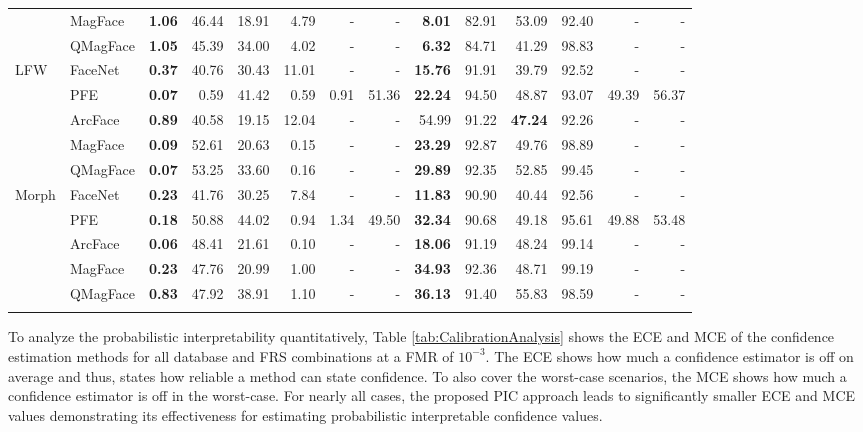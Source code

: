 \documentclass[10pt,twocolumn,letterpaper]{article}
\begin{document}
\begin{table*}[ht]
\begin{tabular}{llrrrrrrrrrrrr}
           & MagFace  & \textbf{1.06}       & 46.44 & 18.91 & 4.79  & -    & -     & \textbf{8.01}       & 82.91 & 53.09 & 92.40 & -      & -     \\
           & QMagFace & \textbf{1.05}       & 45.39 & 34.00 & 4.02  & -    & -     & \textbf{6.32}       & 84.71 & 41.29 & 98.83 & -      & -     \\
\hline
LFW        & FaceNet  & \textbf{0.37}       & 40.76 & 30.43 & 11.01 & -    & -     & \textbf{15.76}      & 91.91 & 39.79 & 92.52 & -      & -     \\
           & PFE      & \textbf{0.07}       & 0.59  & 41.42 & 0.59  & 0.91 & 51.36 & \textbf{22.24}      & 94.50 & 48.87 & 93.07 & 49.39  & 56.37 \\
           & ArcFace  & \textbf{0.89}       & 40.58 & 19.15 & 12.04 & -    & -     & 54.99      & 91.22 & \textbf{47.24} & 92.26 & -      & -     \\
           & MagFace  & \textbf{0.09}       & 52.61 & 20.63 & 0.15  & -    & -     & \textbf{23.29}      & 92.87 & 49.76 & 98.89 & -      & -     \\
           & QMagFace & \textbf{0.07}       & 53.25 & 33.60 & 0.16  & -    & -     & \textbf{29.89}      & 92.35 & 52.85 & 99.45 & -      & -     \\
\hline
Morph      & FaceNet  & \textbf{0.23}       & 41.76 & 30.25 & 7.84  & -    & -     & \textbf{11.83}      & 90.90 & 40.44 & 92.56 & -      & -     \\
           & PFE      & \textbf{0.18}       & 50.88 & 44.02 & 0.94  & 1.34 & 49.50 & \textbf{32.34}      & 90.68 & 49.18 & 95.61 & 49.88  & 53.48 \\
           & ArcFace  & \textbf{0.06}       & 48.41 & 21.61 & 0.10  & -    & -     & \textbf{18.06}      & 91.19 & 48.24 & 99.14 & -      & -     \\
           & MagFace  & \textbf{0.23}       & 47.76 & 20.99 & 1.00  & -    & -     & \textbf{34.93}      & 92.36 & 48.71 & 99.19 & -      & -     \\
           & QMagFace & \textbf{0.83}       & 47.92 & 38.91 & 1.10  & -    & -     & \textbf{36.13}      & 91.40 & 55.83 & 98.59 & -      & -     \\
\Xhline{2\arrayrulewidth}
\end{tabular}
\end{table*}



To analyze the probabilistic interpretability quantitatively, Table \ref{tab:CalibrationAnalysis} shows the ECE and MCE of the confidence estimation methods for all database and FRS combinations at a FMR of $10^{-3}$.
The ECE shows how much a confidence estimator is off on average and thus, states how reliable a method can state confidence.
To also cover the worst-case scenarios, the MCE shows how much a confidence estimator is off in the worst-case.
For nearly all cases, the proposed PIC approach leads to significantly smaller ECE and MCE values demonstrating its effectiveness for estimating probabilistic interpretable confidence values.
\end{document}
